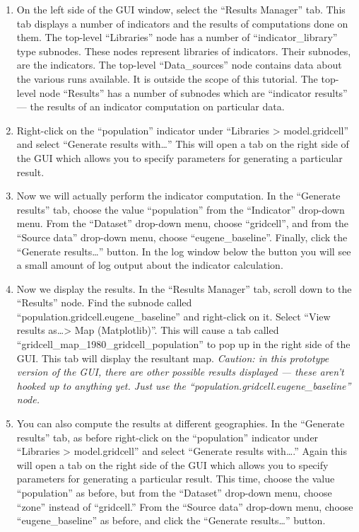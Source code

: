 \documentclass{howto}
\begin{document}
\begin{enumerate}

\item On the left side of the GUI window, select the ``Results Manager''
tab.  This tab displays a number of indicators and the results of
computations done on them.  The top-level ``Libraries'' node has a number
of \mbox{``indicator_library''} type subnodes.  These nodes represent
libraries of indicators.  Their subnodes, are the indicators.  The
top-level ``Data_sources'' node contains data about the various runs
available.  It is outside the scope of this tutorial.  The top-level node
``Results'' has a number of subnodes which are ``indicator results'' ---
the results of an indicator computation on particular data.

\item Right-click on the ``population'' indicator under ``Libraries >
model.gridcell'' and select ``Generate results with\ldots''  This will open a
tab on the right side of the GUI which allows you to specify parameters for
generating a particular result.

\item Now we will actually perform the indicator computation.  In the
``Generate results'' tab, choose the value ``population'' from the
``Indicator'' drop-down menu.  From the ``Dataset'' drop-down menu, choose
``gridcell'', and from the ``Source data'' drop-down menu, choose
``eugene_baseline''.  Finally, click the ``Generate results\ldots'' button.
In the log window below the button you will see a small amount of log
output about the indicator calculation.

\item Now we display the results.  In the ``Results Manager'' tab, scroll
down to the ``Results'' node.  Find the subnode called
``population.gridcell.eugene_baseline'' and right-click on it.  Select
``View results as\ldots > Map (Matplotlib)''.  This will cause a tab called
``gridcell_map_1980_gridcell_population'' to pop up in the right side of
the GUI.  This tab will display the resultant map.  \emph{Caution: in this
prototype version of the GUI, there are other possible results displayed
--- these aren't hooked up to anything yet.  Just use the
``population.gridcell.eugene_baseline'' node.}

\item You can also compute the results at different geographies.  In the
  ``Generate results'' tab, as before right-click on the ``population''
  indicator under ``Libraries > model.gridcell'' and select ``Generate
  results with\ldots.'' Again this will open a tab on the right side of the
  GUI which allows you to specify parameters for generating a particular
  result.  This time, choose the value ``population'' as before, but from
  the ``Dataset'' drop-down menu, choose ``zone'' instead of ``gridcell.''
  From the ``Source data'' drop-down menu, choose ``eugene_baseline'' as
  before, and click the ``Generate results\ldots'' button.


\end{enumerate}
\end{document}
